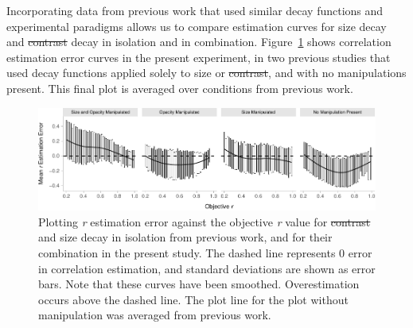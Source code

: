 \documentclass[manuscript, review, anonymous, screen]{acmart}
\providecommand{\DIFaddtex}[1]{{\protect\color{blue}\uwave{#1}}} %
\providecommand{\DIFdeltex}[1]{{\protect\color{red}\sout{#1}}}                      %
\providecommand{\DIFaddbegin}{} %
\providecommand{\DIFaddend}{} %
\providecommand{\DIFdelbegin}{} %
\providecommand{\DIFdelend}{} %
\providecommand{\DIFaddFL}[1]{\DIFadd{#1}} %
\providecommand{\DIFdelFL}[1]{\DIFdel{#1}} %
\providecommand{\DIFaddbeginFL}{} %
\providecommand{\DIFaddendFL}{} %
\providecommand{\DIFdelbeginFL}{} %
\providecommand{\DIFdelendFL}{} %
\providecommand{\DIFadd}[1]{\texorpdfstring{\DIFaddtex{#1}}{#1}} %
\providecommand{\DIFdel}[1]{\texorpdfstring{\DIFdeltex{#1}}{}} %
\newcommand{\DIFscaledelfig}{0.5}
\newlength{\DIFdelgraphicswidth} %
\newlength{\DIFdelgraphicsheight} %
\newcommand{\DIFaddincludegraphics}[2][]{{\color{blue}\fbox{\DIFOincludegraphics[#1]{#2}}}} %
\newcommand{\DIFdelincludegraphics}[2][]{%
\sbox{\DIFdelgraphicsbox}{\DIFOincludegraphics[#1]{#2}}%
\settoboxwidth{\DIFdelgraphicswidth}{\DIFdelgraphicsbox} %
\settoboxtotalheight{\DIFdelgraphicsheight}{\DIFdelgraphicsbox} %
\scalebox{\DIFscaledelfig}{%
\parbox[b]{\DIFdelgraphicswidth}{\usebox{\DIFdelgraphicsbox}\\[-\baselineskip] \rule{\DIFdelgraphicswidth}{0em}}\llap{\resizebox{\DIFdelgraphicswidth}{\DIFdelgraphicsheight}{%
\setlength{\unitlength}{\DIFdelgraphicswidth}%
\begin{picture}(1,1)%
\thicklines\linethickness{2pt} %
{\color[rgb]{1,0,0}\put(0,0){\framebox(1,1){}}}%
{\color[rgb]{1,0,0}\put(0,0){\line( 1,1){1}}}%
{\color[rgb]{1,0,0}\put(0,1){\line(1,-1){1}}}%
\end{picture}%
}\hspace*{3pt}}} %
} %
\DeclareRobustCommand{\DIFaddbegin}{\DIFOaddbegin \let\includegraphics\DIFaddincludegraphics} %
\DeclareRobustCommand{\DIFaddend}{\DIFOaddend \let\includegraphics\DIFOincludegraphics} %
\DeclareRobustCommand{\DIFdelbegin}{\DIFOdelbegin \let\includegraphics\DIFdelincludegraphics} %
\DeclareRobustCommand{\DIFdelend}{\DIFOaddend \let\includegraphics\DIFOincludegraphics} %
\DeclareRobustCommand{\DIFaddbeginFL}{\DIFOaddbeginFL \let\includegraphics\DIFaddincludegraphics} %
\DeclareRobustCommand{\DIFaddendFL}{\DIFOaddendFL \let\includegraphics\DIFOincludegraphics} %
\DeclareRobustCommand{\DIFdelbeginFL}{\DIFOdelbeginFL \let\includegraphics\DIFdelincludegraphics} %
\DeclareRobustCommand{\DIFdelendFL}{\DIFOaddendFL \let\includegraphics\DIFOincludegraphics} %
\begin{document}
Incorporating data from previous work \citep{strain_2023, strain_2023b}
that used similar decay functions and experimental paradigms allows us
to compare estimation curves for size decay and \DIFdelbegin \DIFdel{contrast }\DIFdelend \DIFaddbegin \DIFadd{opacity }\DIFaddend decay in
isolation and in combination. Figure~\ref{fig-est-multi-exp} shows
correlation estimation error curves in the present experiment, in two
previous studies that used decay functions applied solely to size or
\DIFdelbegin \DIFdel{contrast}\DIFdelend \DIFaddbegin \DIFadd{opacity}\DIFaddend , and with no manipulations present. This final plot is averaged
over conditions from previous work.

\begin{figure}

{\centering \includegraphics[width=1\textwidth,height=\textheight]{size_and_opacity_files/figure-pdf/fig-est-multi-exp-1.pdf}

}

\caption{\label{fig-est-multi-exp}Plotting \emph{r} estimation error
against the objective \emph{r} value for \DIFdelbeginFL \DIFdelFL{contrast }\DIFdelendFL \DIFaddbeginFL \DIFaddFL{opacity }\DIFaddendFL and size decay in
isolation from previous work, and for their combination in the present
study. The dashed line represents 0 error in correlation estimation, and
standard deviations are shown as error bars. Note that these curves have
been smoothed. Overestimation occurs above the dashed line. The plot
line for the plot without manipulation was averaged from previous work.}

\end{figure}
\end{document}
